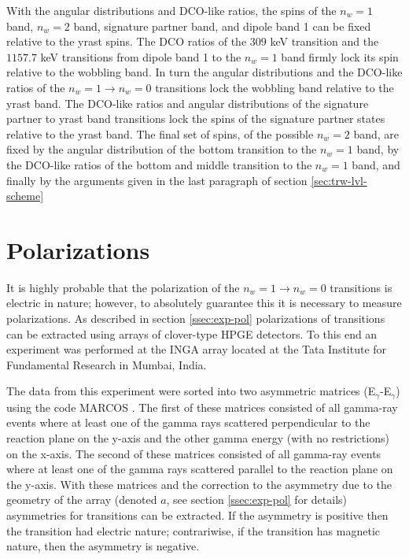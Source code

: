 With the angular distributions and DCO-like ratios, the spins of the $n_w=1$ band, $n_w=2$ band, signature partner band, and dipole band 1 can be fixed relative to the yrast spins. The DCO ratios of the $309$ keV transition and the $1157.7$ keV transitions from dipole band 1 to the $n_w=1$ band firmly lock its spin relative to the wobbling band. In turn the angular distributions and the DCO-like ratios of the $n_w=1\rightarrow{}n_w=0$ transitions lock the wobbling band relative to the yrast band. The DCO-like ratios and angular distributions of the signature partner to yrast band transitions lock the spins of the signature partner states relative to the yrast band. The final set of spins, of the possible $n_w=2$ band, are fixed by the angular distribution of the bottom transition to the $n_w=1$ band, by the DCO-like ratios of the bottom and middle transition to the $n_w=1$ band, and finally by the arguments given in the last paragraph of section \ref{sec:trw-lvl-scheme}

\section{Polarizations}
\label{ssec:trw-lvl-pol}

It is highly probable that the polarization of the $n_w=1\rightarrow{}n_w=0$ transitions is electric in nature; however, to absolutely guarantee this it is necessary to measure polarizations. As described in section \ref{ssec:exp-pol} polarizations of transitions can be extracted using arrays of clover-type HPGE detectors. To this end an experiment was performed at the INGA array \cite{ingaAtIUAC,ingaAtIuacConf} located at the Tata Institute for Fundamental Research in Mumbai, India.

The data from this experiment were sorted into two asymmetric matrices (E$_{\gamma}$-E$_{\gamma}$) using the code MARCOS \cite{IngaDigitalDAQ}. The first of these matrices consisted of all gamma-ray events where at least one of the gamma rays scattered perpendicular to the reaction plane on the y-axis and the other gamma energy (with no restrictions) on the x-axis. The second of these matrices consisted of all gamma-ray events where at least one of the gamma rays scattered parallel to the reaction plane on the y-axis. With these matrices and the correction to the asymmetry due to the geometry of the array (denoted $a$, see section \ref{ssec:exp-pol} for details) asymmetries for transitions can be extracted. If the asymmetry is positive then the transition had electric nature; contrariwise, if the transition has magnetic nature, then the asymmetry is negative.

